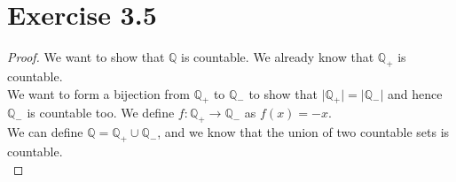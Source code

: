 \documentclass{article} %
\newcommand{\homeworkNumber}{3}
\begin{document}
\section*{Exercise \homeworkNumber.5}
\begin{proof}
We want to show that $\mathbb Q$ is countable. We already know that $\mathbb Q_+$ is countable. \\
We want to form a bijection from $\mathbb Q_+$ to $\mathbb Q_-$ to show that $\lvert \mathbb Q_+ \lvert = \lvert \mathbb Q_- \lvert$ and hence $\mathbb Q_-$ is countable too.
We define $f:\mathbb Q_+ \rightarrow \mathbb Q_-$ as $f(x) = -x$. \\
We can define $\mathbb Q = \mathbb Q_+ \cup \mathbb Q_-$, and we know that the union of two countable sets is countable. \\
\end{proof}
\end{document}
